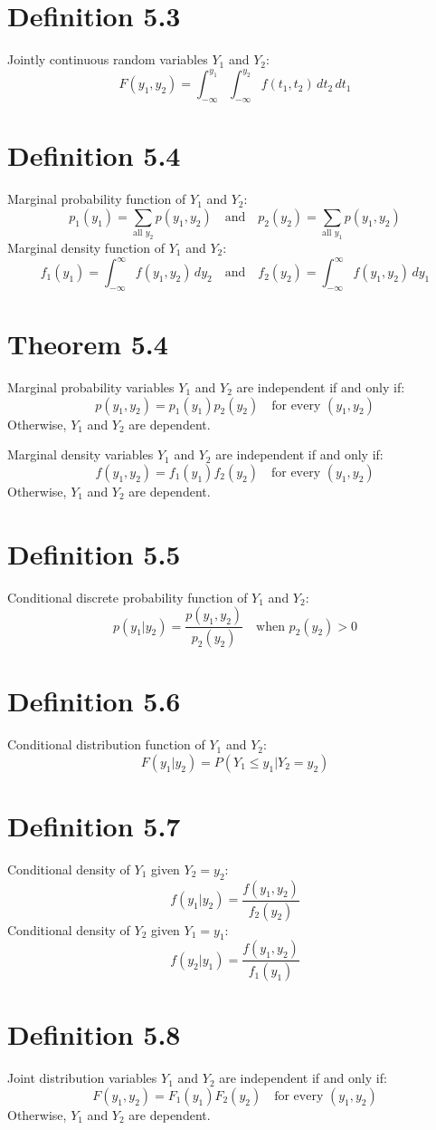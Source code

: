 \documentclass[12pt]{article}
\begin{document}
\section{Definition 5.3}
Jointly continuous random variables $Y_1$ and $Y_2$:
\[
F(y_1, y_2) = \int_{-\infty}^{y_1} \int_{-\infty}^{y_2} f(t_1, t_2) \, dt_2 \, dt_1
\]

\section{Definition 5.4}
Marginal probability function of $Y_1$ and $Y_2$:
\[
p_1(y_1) = \sum_{\text{all } y_2} p(y_1, y_2) \quad \text{and} \quad p_2(y_2) = \sum_{\text{all } y_1} p(y_1, y_2)
\]
Marginal density function of $Y_1$ and $Y_2$:
\[
f_1(y_1) = \int_{-\infty}^{\infty} f(y_1, y_2) \, dy_2 \quad \text{and} \quad f_2(y_2) = \int_{-\infty}^{\infty} f(y_1, y_2) \, dy_1
\]

\section{Theorem 5.4}
Marginal probability variables $Y_1$ and $Y_2$ are independent if and only if:
\[
p(y_1, y_2) = p_1(y_1)p_2(y_2) \quad \text{for every } (y_1, y_2)
\]
Otherwise, $Y_1$ and $Y_2$ are dependent.

Marginal density variables $Y_1$ and $Y_2$ are independent if and only if:
\[
f(y_1, y_2) = f_1(y_1)f_2(y_2) \quad \text{for every } (y_1, y_2)
\]
Otherwise, $Y_1$ and $Y_2$ are dependent.


\section{Definition 5.5}
Conditional discrete probability function of $Y_1$ and $Y_2$:
\[
p(y_1|y_2) = \frac{p(y_1, y_2)}{p_2(y_2)} \quad \text{when } p_2(y_2) > 0
\]

\section{Definition 5.6}
Conditional distribution function of $Y_1$ and $Y_2$:
\[
F(y_1|y_2) = P(Y_1 \leq y_1 | Y_2 = y_2)
\]

\section{Definition 5.7}
Conditional density of $Y_1$ given $Y_2 = y_2$:
\[
f(y_1|y_2) = \frac{f(y_1, y_2)}{f_2(y_2)}
\]
Conditional density of $Y_2$ given $Y_1 = y_1$:
\[
f(y_2|y_1) = \frac{f(y_1, y_2)}{f_1(y_1)}
\]

\section{Definition 5.8}
Joint distribution variables $Y_1$ and $Y_2$ are independent if and only if:
\[
F(y_1, y_2) = F_1(y_1)F_2(y_2) \quad \text{for every } (y_1, y_2)
\]
Otherwise, $Y_1$ and $Y_2$ are dependent.
\end{document}
